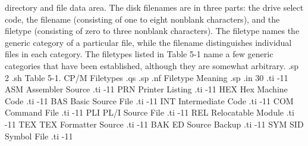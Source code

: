 directory and file data area.  The disk filenames are in three 
parts: the drive select code, the filename (consisting of one to 
eight nonblank characters), and the filetype (consisting of zero 
to three nonblank characters).  The filetype names the generic 
category of a particular file, while the filename distinguishes 
individual files in each category.  The filetypes listed in Table 5-1 
name a few generic categories that have been established, 
although they are somewhat arbitrary.
.sp 2
.sh
                   Table 5-1.  CP/M Filetypes
.qs
.sp
.nf
                Filetype           Meaning
.sp
.in 30
.ti -11
ASM        Assembler Source      
.ti -11
PRN        Printer Listing       
.ti -11
HEX        Hex Machine Code      
.ti -11
BAS        Basic Source File     
.ti -11
INT        Intermediate Code     
.ti -11
COM        Command File          
.ti -11
PLI        PL/I Source File       
.ti -11
REL        Relocatable Module     
.ti -11
TEX        TEX Formatter Source   
.ti -11
BAK        ED Source Backup       
.ti -11
SYM        SID Symbol File        
.ti -11
